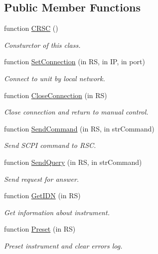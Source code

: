 \subsection*{Public Member Functions}
\begin{DoxyCompactItemize}
\item 
function \hyperlink{class_c_r_s_c_a9725a31fadc37da312608237d7da3779}{C\-R\-S\-C} ()
\begin{DoxyCompactList}\small\item\em Consturctor of this class. \end{DoxyCompactList}\item 
function \hyperlink{class_c_r_s_c_ad8852adcd3474f0dddb49c6c27f70014}{Set\-Connection} (in R\-S, in I\-P, in port)
\begin{DoxyCompactList}\small\item\em Connect to unit by local network. \end{DoxyCompactList}\item 
function \hyperlink{class_c_r_s_c_a4e3e35fc6172c7550e58fae0b5b098a7}{Close\-Connection} (in R\-S)
\begin{DoxyCompactList}\small\item\em Close connection and return to manual control. \end{DoxyCompactList}\item 
function \hyperlink{class_c_r_s_c_a83851a7742d4988028b6e2ae8e300ca3}{Send\-Command} (in R\-S, in str\-Command)
\begin{DoxyCompactList}\small\item\em Send S\-C\-P\-I command to R\-S\-C. \end{DoxyCompactList}\item 
function \hyperlink{class_c_r_s_c_a688ac03d48974753aa592203a1043407}{Send\-Query} (in R\-S, in str\-Command)
\begin{DoxyCompactList}\small\item\em Send request for answer. \end{DoxyCompactList}\item 
function \hyperlink{class_c_r_s_c_a496b2cfe6b0a0d9969d1a34d58bae8c8}{Get\-I\-D\-N} (in R\-S)
\begin{DoxyCompactList}\small\item\em Get information about instrument. \end{DoxyCompactList}\item 
function \hyperlink{class_c_r_s_c_a5a1cc70414806e77dea5764f4f4448e7}{Preset} (in R\-S)
\begin{DoxyCompactList}\small\item\em Preset instrument and clear errors log. \end{DoxyCompactList}\item 

\end{DoxyCompactItemize}
